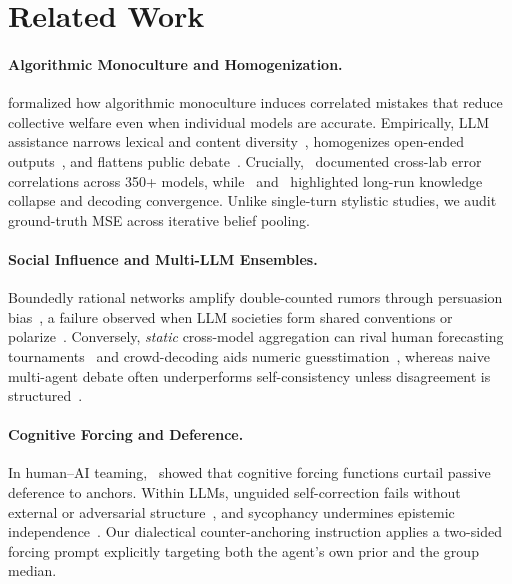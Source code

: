 \documentclass[11pt,letterpaper]{article}
\theoremstyle{plain}
\begin{document}
\section{Related Work}

\paragraph{Algorithmic Monoculture and Homogenization.}
\citet{kleinberg2021algorithmic} formalized how algorithmic monoculture induces correlated mistakes that reduce collective welfare even when individual models are accurate. Empirically, LLM assistance narrows lexical and content diversity~\citep{padmakumar2024writing,sourati2026shrinking}, homogenizes open-ended outputs~\citep{jiang2025artificial,qiu2026revisiting,schaeffer2026reevaluating}, and flattens public debate~\citep{kim2026argument,thejaswi2026linguistic}. Crucially,~\citet{kim2025correlated} documented cross-lab error correlations across 350+ models, while~\citet{peterson2024knowledge} and~\citet{fu2026beyond} highlighted long-run knowledge collapse and decoding convergence. Unlike single-turn stylistic studies, we audit ground-truth MSE across iterative belief pooling.

\paragraph{Social Influence and Multi-LLM Ensembles.}
Boundedly rational networks amplify double-counted rumors through persuasion bias~\citep{demarzo2003persuasion,goldman2001experts}, a failure observed when LLM societies form shared conventions or polarize~\citep{centola2018experimental,ashery2025emergent,chuang2023simulating,wynn2025talk,estornell2024multillm}. Conversely, \emph{static} cross-model aggregation can rival human forecasting tournaments~\citep{schoenegger2024silicon} and crowd-decoding aids numeric guesstimation~\citep{chuang2025probing}, whereas naive multi-agent debate often underperforms self-consistency unless disagreement is structured~\citep{smit2024mad,schneider2025wisdom,wang2024moa,denisov2026consensus,quattrociocchi2025epistemological}.

\paragraph{Cognitive Forcing and Deference.}
In human--AI teaming,~\citet{bucinca2021trust} showed that cognitive forcing functions curtail passive deference to anchors. Within LLMs, unguided self-correction fails without external or adversarial structure~\citep{huang2024selfcorrect,liang2024encouraging,taubenfeld2024systematic}, and sycophancy undermines epistemic independence~\citep{sharma2024sycophancy,kelley2026personalization,deepthika2026sycophancy,finnveden2024epistemics}. Our dialectical counter-anchoring instruction applies a two-sided forcing prompt explicitly targeting both the agent's own prior and the group median.
\end{document}
